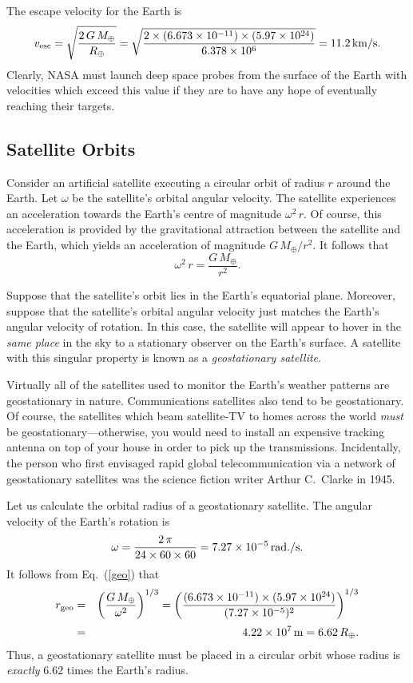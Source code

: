 The escape velocity for the Earth is
\begin{equation}
v_{\rm esc} = \sqrt{\frac{2\,G\,M_\oplus}{R_\oplus}} = 
\sqrt{\frac{2\times(6.673\times 10^{-11})\times(5.97\times 10^{24})}{6.378\times 10^6}}=
11.2\,{\rm km/s}.
\end{equation}
Clearly, NASA must launch deep space probes from the surface of the Earth with  velocities which exceed this value if they are 
to have any hope of eventually reaching their targets.

\subsection{Satellite Orbits}
Consider an artificial satellite executing a circular orbit of radius $r$ around the
Earth. Let $\omega$ be the satellite's orbital angular velocity. 
The satellite experiences an acceleration towards the Earth's centre of magnitude
$\omega^2\,r$. Of course, this acceleration is provided by the 
gravitational attraction between the satellite and the Earth, which yields an acceleration of magnitude
$G\,M_\oplus/r^2$. It follows that
\begin{equation}\label{geo}
\omega^2\,r = \frac{G\,M_\oplus}{r^2}.
\end{equation}

Suppose that the satellite's orbit lies in the Earth's equatorial plane. 
Moreover, suppose that the satellite's orbital angular velocity just matches the
Earth's angular velocity of rotation. In this case, the satellite will appear to
hover in the {\em same place} in the sky to a stationary observer on the Earth's surface. A satellite with
this singular property is known as a {\em geostationary satellite}. 

Virtually all of the satellites used to monitor the Earth's weather patterns
are geostationary in nature. Communications satellites  also tend to be geostationary. 
Of course, the satellites which beam satellite-TV to homes across the world {\em must}  be
geostationary---otherwise, you would need to install an expensive tracking antenna on top
of your house in order to pick up  the transmissions. Incidentally, the  person who first
envisaged rapid global telecommunication via a network of geostationary
 satellites was the science fiction writer Arthur C.\ Clarke in 1945.

Let us calculate the orbital radius of a geostationary satellite. The angular
velocity of the Earth's rotation is
\begin{equation}
\omega = \frac{2\,\pi}{24\times 60 \times 60} = 7.27\times 10^{-5}\,{\rm rad./s}.
\end{equation}
It follows from Eq.~(\ref{geo}) that
\begin{eqnarray}
r_{\rm geo} &=& \left(\frac{G\,M_\oplus}{\omega^2}\right)^{1/3} = 
 \left(\frac{(6.673\times 10^{-11})\times(5.97\times 10^{24})}{(7.27\times 10^{-5})^2}\right)^{1/3}\nonumber
\\[0.5ex]
&=&4.22\times 10^7\,{\rm m} = 6.62\,R_\oplus.
\end{eqnarray}
Thus, a geostationary satellite must be placed in a circular orbit whose radius
is {\em exactly} $6.62$ times the Earth's radius.

